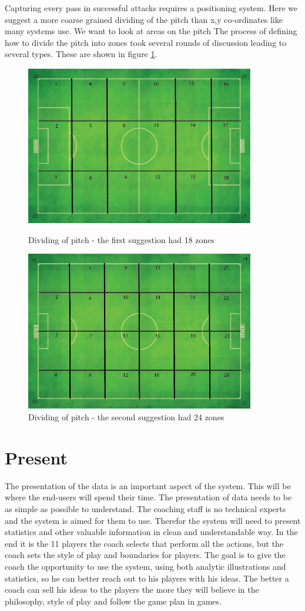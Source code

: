 Capturing every pass in successful attacks requires a positioning system. Here we suggest a more coarse grained dividing of the pitch than x,y co-ordinates like many systems use. We want to look at areas on the pitch The process of defining how to divide the pitch into zones took several rounds of discussion leading to several types. These are shown in figure \ref{fig:zones}.

\begin{figure}[ht!]
\centering
\includegraphics[width=100mm]{images/general/first_zones.png}
\caption{Dividing of pitch - the first suggestion had 18 zones}
\includegraphics[width=100mm]{images/general/second_zones.png}
\caption{Dividing of pitch - the second suggestion had 24 zones}
\label{fig:zones}
\end{figure}


\section{Present}

The presentation of the data is an important aspect of the system. This will be where the end-users will spend their time. The presentation of data needs to be as simple as possible to understand. The coaching staff is no technical experts and the system is aimed for them to use. Therefor the system will need to present statistics and other valuable information in clean and understandable way. In the end it is the 11 players the coach selects that perform all the actions, but the coach sets the style of play and boundaries for players. The goal is to give the coach the opportunity to use the system, using both analytic illustrations and statistics, so he can better reach out to his players with his ideas. The better a coach can sell his ideas to the players the more they will believe in the philosophy, style of play and follow the game plan in games.

